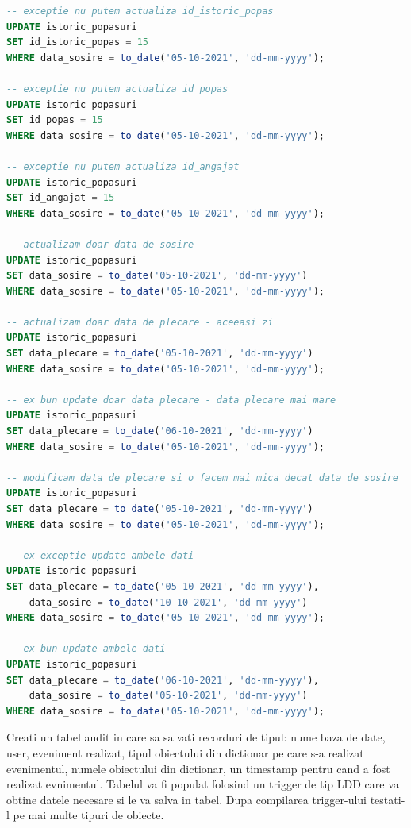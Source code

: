 \documentclass[12pt, a4paper]{article}
\begin{document}
\begin{lstlisting}[language=SQL]
-- exceptie nu putem actualiza id_istoric_popas
UPDATE istoric_popasuri
SET id_istoric_popas = 15
WHERE data_sosire = to_date('05-10-2021', 'dd-mm-yyyy');

-- exceptie nu putem actualiza id_popas
UPDATE istoric_popasuri
SET id_popas = 15
WHERE data_sosire = to_date('05-10-2021', 'dd-mm-yyyy');

-- exceptie nu putem actualiza id_angajat
UPDATE istoric_popasuri
SET id_angajat = 15
WHERE data_sosire = to_date('05-10-2021', 'dd-mm-yyyy');

-- actualizam doar data de sosire
UPDATE istoric_popasuri
SET data_sosire = to_date('05-10-2021', 'dd-mm-yyyy')
WHERE data_sosire = to_date('05-10-2021', 'dd-mm-yyyy');

-- actualizam doar data de plecare - aceeasi zi
UPDATE istoric_popasuri
SET data_plecare = to_date('05-10-2021', 'dd-mm-yyyy')
WHERE data_sosire = to_date('05-10-2021', 'dd-mm-yyyy');

-- ex bun update doar data plecare - data plecare mai mare
UPDATE istoric_popasuri
SET data_plecare = to_date('06-10-2021', 'dd-mm-yyyy')
WHERE data_sosire = to_date('05-10-2021', 'dd-mm-yyyy');

-- modificam data de plecare si o facem mai mica decat data de sosire
UPDATE istoric_popasuri
SET data_plecare = to_date('05-10-2021', 'dd-mm-yyyy')
WHERE data_sosire = to_date('05-10-2021', 'dd-mm-yyyy');

-- ex exceptie update ambele dati
UPDATE istoric_popasuri
SET data_plecare = to_date('05-10-2021', 'dd-mm-yyyy'),
    data_sosire = to_date('10-10-2021', 'dd-mm-yyyy')
WHERE data_sosire = to_date('05-10-2021', 'dd-mm-yyyy');

-- ex bun update ambele dati
UPDATE istoric_popasuri
SET data_plecare = to_date('06-10-2021', 'dd-mm-yyyy'),
    data_sosire = to_date('05-10-2021', 'dd-mm-yyyy')
WHERE data_sosire = to_date('05-10-2021', 'dd-mm-yyyy');
\end{lstlisting}

Creati un tabel audit in care sa salvati recorduri de tipul: nume baza de date,
user, eveniment realizat, tipul obiectului din dictionar pe care s-a realizat
evenimentul, numele obiectului din dictionar, un timestamp pentru cand a fost
realizat evnimentul. Tabelul va fi populat folosind un trigger de tip LDD care
va obtine datele necesare si le va salva in tabel. Dupa compilarea trigger-ului
testati-l pe mai multe tipuri de obiecte.
\end{document}
